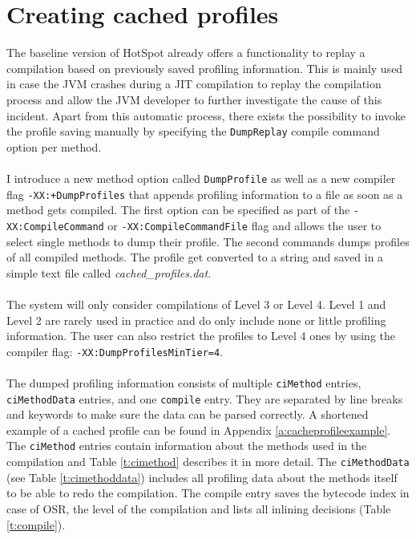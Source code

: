 \section{Creating cached profiles}
\label{s:creatingprofiles}
The baseline version of HotSpot already offers a functionality to replay a compilation based on previously saved profiling information.
This is mainly used in case the JVM crashes during a JIT compilation to replay the compilation process and allow the JVM developer to further investigate the cause of this incident.
Apart from this automatic process, there exists the possibility to invoke the profile saving manually by specifying the \texttt{DumpReplay} compile command option per method.
\\\\
I introduce a new method option called \texttt{DumpProfile} as well as a new compiler flag \newline\texttt{-XX:+DumpProfiles} that appends profiling information to a file as soon as a method gets compiled. The first option can be specified as part of the \texttt{-XX:CompileCommand} or \texttt{-XX:CompileCommandFile} flag and allows the user to select single methods to dump their profile. The second commands dumps profiles of all compiled methods.
The profile get converted to a string and saved in a simple text file called \textit{cached\_profiles.dat}.
\\\\
The system will only consider compilations of Level 3 or Level 4. Level 1 and Level 2 are rarely used in practice and do only include none or little profiling information. The user can also restrict the profiles to Level 4 ones by using the compiler flag: \texttt{-XX:DumpProfilesMinTier=4}.
\\\\
The dumped profiling information consists of multiple \texttt{ciMethod} entries, \texttt{ciMethodData} entries, and one \texttt{compile} entry. They are separated by line breaks and keywords to make sure the data can be parsed correctly. A shortened example of a cached profile can be found in Appendix \ref{a:cacheprofileexample}. The \texttt{ciMethod} entries contain information about the methods used in the compilation and Table \ref{t:cimethod} describes it in more detail. The \texttt{ciMethodData} (see Table \ref{t:cimethoddata}) includes all profiling data about the methods itself to be able to redo the compilation.
The compile entry saves the bytecode index in case of OSR, the level of the compilation and lists all inlining decisions (Table \ref{t:compile}).
